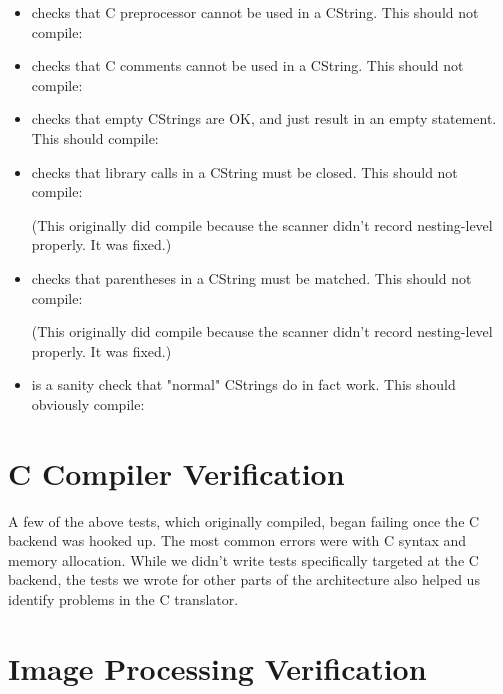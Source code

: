 \begin{itemize}

\item{} checks that C preprocessor cannot be used in a CString. This should not compile:


\item{} checks that C comments cannot be used in a CString. This should not compile:


\item{} checks that empty CStrings are OK, and just result in an empty statement. This should compile:


\item{} checks that library calls in a CString must be closed. This should not compile:

(This originally did compile because the scanner didn't record nesting-level properly. It was fixed.)

\item{} checks that parentheses in a CString must be matched. This should not compile:

(This originally did compile because the scanner didn't record nesting-level properly. It was fixed.)

\item{} is a sanity check that "normal" CStrings do in fact work. This should obviously compile:


\end{itemize}

\section{C Compiler Verification}
\label{test:ccompiler}

A few of the above tests, which originally compiled, began failing once the C backend was hooked up.
The most common errors were with C syntax and memory allocation.
While we didn't write tests specifically targeted at the C backend,
the tests we wrote for other parts of the architecture also helped us identify problems in the C translator. 

\section{Image Processing Verification}
\label{test:output}

